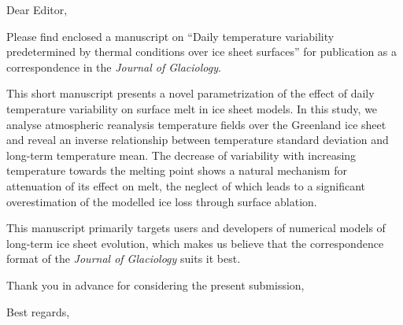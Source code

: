 \documentclass{letter}
\begin{document}
\begin{letter}{}

\opening{Dear Editor,}

Please find enclosed a manuscript on ``Daily temperature variability predetermined by thermal conditions over ice sheet surfaces'' for publication as a correspondence in the \emph{Journal of Glaciology}.

This short manuscript presents a novel parametrization of the effect of daily temperature variability on surface melt in ice sheet models. In this study, we analyse atmospheric reanalysis temperature fields over the Greenland ice sheet and reveal an inverse relationship between temperature standard deviation and long-term temperature mean. The decrease of variability with increasing temperature towards the melting point shows a natural mechanism for attenuation of its effect on melt, the neglect of which leads to a significant overestimation of the modelled ice loss through surface ablation.

This manuscript primarily targets users and developers of numerical models of long-term ice sheet evolution, which makes us believe that the correspondence format of the \emph{Journal of Glaciology} suits it best.

Thank you in advance for considering the present submission,

\closing{Best regards,}

\end{letter}
\end{document}
